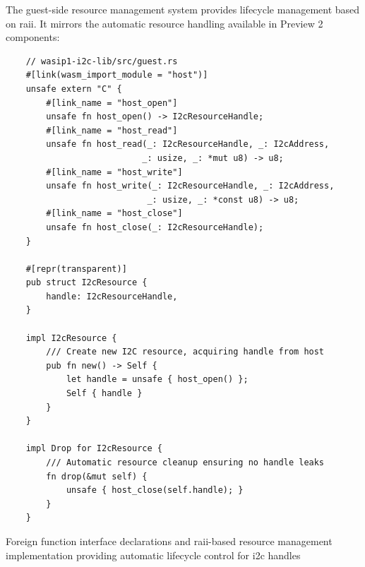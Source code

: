 The guest-side resource management system provides lifecycle management based on \acrshort{raii}. It mirrors the automatic resource handling available in Preview 2 components:

\begin{listing}[H]
    \begin{verbatim}
    // wasip1-i2c-lib/src/guest.rs
    #[link(wasm_import_module = "host")]
    unsafe extern "C" {
        #[link_name = "host_open"]
        unsafe fn host_open() -> I2cResourceHandle;
        #[link_name = "host_read"]
        unsafe fn host_read(_: I2cResourceHandle, _: I2cAddress, 
                           _: usize, _: *mut u8) -> u8;
        #[link_name = "host_write"]
        unsafe fn host_write(_: I2cResourceHandle, _: I2cAddress, 
                            _: usize, _: *const u8) -> u8;
        #[link_name = "host_close"]
        unsafe fn host_close(_: I2cResourceHandle);
    }
    
    #[repr(transparent)]
    pub struct I2cResource {
        handle: I2cResourceHandle,
    }

    impl I2cResource {
        /// Create new I2C resource, acquiring handle from host
        pub fn new() -> Self {
            let handle = unsafe { host_open() };
            Self { handle }
        }
    }
    
    impl Drop for I2cResource {
        /// Automatic resource cleanup ensuring no handle leaks
        fn drop(&mut self) {
            unsafe { host_close(self.handle); }
        }
    }
    \end{verbatim}
    \caption{Foreign function interface declarations and \acrshort{raii}-based resource management implementation providing automatic lifecycle control for \acrshort{i2c} handles}
    \label{lst:guest-ffi-declarations}
\end{listing}

